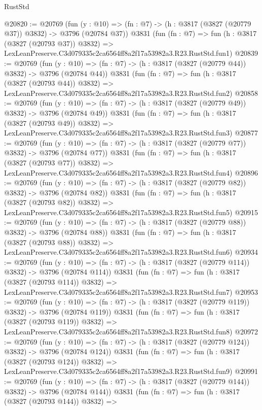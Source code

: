 \begin{lexlean}{RustStd}
\begin{coremodule}
@20820 := @20769
    (fun (y : @10) => (fn : @7) -> (h : @3817 (@3827 (@20779 @37)) @3832) -> @3796 (@20784 @37))
    @3831
    (fun (fn : @7) =>
    fun (h : @3817 (@3827 (@20793 @37)) @3832) =>
    LexLeanPreserve.C3d079335c2ca6564ff8a2f17a53982a3.R23.RustStd.fun1)
@20839 := @20769
    (fun (y : @10) => (fn : @7) -> (h : @3817 (@3827 (@20779 @44)) @3832) -> @3796 (@20784 @44))
    @3831
    (fun (fn : @7) =>
    fun (h : @3817 (@3827 (@20793 @44)) @3832) =>
    LexLeanPreserve.C3d079335c2ca6564ff8a2f17a53982a3.R23.RustStd.fun2)
@20858 := @20769
    (fun (y : @10) => (fn : @7) -> (h : @3817 (@3827 (@20779 @49)) @3832) -> @3796 (@20784 @49))
    @3831
    (fun (fn : @7) =>
    fun (h : @3817 (@3827 (@20793 @49)) @3832) =>
    LexLeanPreserve.C3d079335c2ca6564ff8a2f17a53982a3.R23.RustStd.fun3)
@20877 := @20769
    (fun (y : @10) => (fn : @7) -> (h : @3817 (@3827 (@20779 @77)) @3832) -> @3796 (@20784 @77))
    @3831
    (fun (fn : @7) =>
    fun (h : @3817 (@3827 (@20793 @77)) @3832) =>
    LexLeanPreserve.C3d079335c2ca6564ff8a2f17a53982a3.R23.RustStd.fun4)
@20896 := @20769
    (fun (y : @10) => (fn : @7) -> (h : @3817 (@3827 (@20779 @82)) @3832) -> @3796 (@20784 @82))
    @3831
    (fun (fn : @7) =>
    fun (h : @3817 (@3827 (@20793 @82)) @3832) =>
    LexLeanPreserve.C3d079335c2ca6564ff8a2f17a53982a3.R23.RustStd.fun5)
@20915 := @20769
    (fun (y : @10) => (fn : @7) -> (h : @3817 (@3827 (@20779 @88)) @3832) -> @3796 (@20784 @88))
    @3831
    (fun (fn : @7) =>
    fun (h : @3817 (@3827 (@20793 @88)) @3832) =>
    LexLeanPreserve.C3d079335c2ca6564ff8a2f17a53982a3.R23.RustStd.fun6)
@20934 := @20769
    (fun (y : @10) => (fn : @7) -> (h : @3817 (@3827 (@20779 @114)) @3832) -> @3796 (@20784 @114))
    @3831
    (fun (fn : @7) =>
    fun (h : @3817 (@3827 (@20793 @114)) @3832) =>
    LexLeanPreserve.C3d079335c2ca6564ff8a2f17a53982a3.R23.RustStd.fun7)
@20953 := @20769
    (fun (y : @10) => (fn : @7) -> (h : @3817 (@3827 (@20779 @119)) @3832) -> @3796 (@20784 @119))
    @3831
    (fun (fn : @7) =>
    fun (h : @3817 (@3827 (@20793 @119)) @3832) =>
    LexLeanPreserve.C3d079335c2ca6564ff8a2f17a53982a3.R23.RustStd.fun8)
@20972 := @20769
    (fun (y : @10) => (fn : @7) -> (h : @3817 (@3827 (@20779 @124)) @3832) -> @3796 (@20784 @124))
    @3831
    (fun (fn : @7) =>
    fun (h : @3817 (@3827 (@20793 @124)) @3832) =>
    LexLeanPreserve.C3d079335c2ca6564ff8a2f17a53982a3.R23.RustStd.fun9)
@20991 := @20769
    (fun (y : @10) => (fn : @7) -> (h : @3817 (@3827 (@20779 @144)) @3832) -> @3796 (@20784 @144))
    @3831
    (fun (fn : @7) =>
    fun (h : @3817 (@3827 (@20793 @144)) @3832) =>

\end{coremodule}
\end{lexlean}
